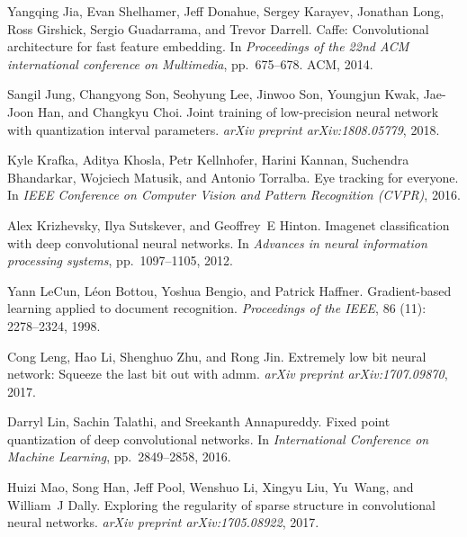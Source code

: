 \documentclass{article} %
\begin{document}
\begin{thebibliography}{36}
Yangqing Jia, Evan Shelhamer, Jeff Donahue, Sergey Karayev, Jonathan Long, Ross
  Girshick, Sergio Guadarrama, and Trevor Darrell.
\newblock Caffe: Convolutional architecture for fast feature embedding.
\newblock In \emph{Proceedings of the 22nd ACM international conference on
  Multimedia}, pp.\ 675--678. ACM, 2014.

Sangil Jung, Changyong Son, Seohyung Lee, Jinwoo Son, Youngjun Kwak, Jae-Joon
  Han, and Changkyu Choi.
\newblock Joint training of low-precision neural network with quantization
  interval parameters.
\newblock \emph{arXiv preprint arXiv:1808.05779}, 2018.

Kyle Krafka, Aditya Khosla, Petr Kellnhofer, Harini Kannan, Suchendra
  Bhandarkar, Wojciech Matusik, and Antonio Torralba.
\newblock Eye tracking for everyone.
\newblock In \emph{IEEE Conference on Computer Vision and Pattern Recognition
  (CVPR)}, 2016.

Alex Krizhevsky, Ilya Sutskever, and Geoffrey~E Hinton.
\newblock Imagenet classification with deep convolutional neural networks.
\newblock In \emph{Advances in neural information processing systems}, pp.\  1097--1105, 2012.

Yann LeCun, L{\'e}on Bottou, Yoshua Bengio, and Patrick Haffner.
\newblock Gradient-based learning applied to document recognition.
\newblock \emph{Proceedings of the IEEE}, 86 (11):
  2278--2324, 1998.

Cong Leng, Hao Li, Shenghuo Zhu, and Rong Jin.
\newblock Extremely low bit neural network: Squeeze the last bit out with admm.
\newblock \emph{arXiv preprint arXiv:1707.09870}, 2017.

Darryl Lin, Sachin Talathi, and Sreekanth Annapureddy.
\newblock Fixed point quantization of deep convolutional networks.
\newblock In \emph{International Conference on Machine Learning}, pp.\  2849--2858, 2016.

Huizi Mao, Song Han, Jeff Pool, Wenshuo Li, Xingyu Liu, Yu~Wang, and William~J
  Dally.
\newblock Exploring the regularity of sparse structure in convolutional neural
  networks.
\newblock \emph{arXiv preprint arXiv:1705.08922}, 2017.


\end{thebibliography}
\end{document}
